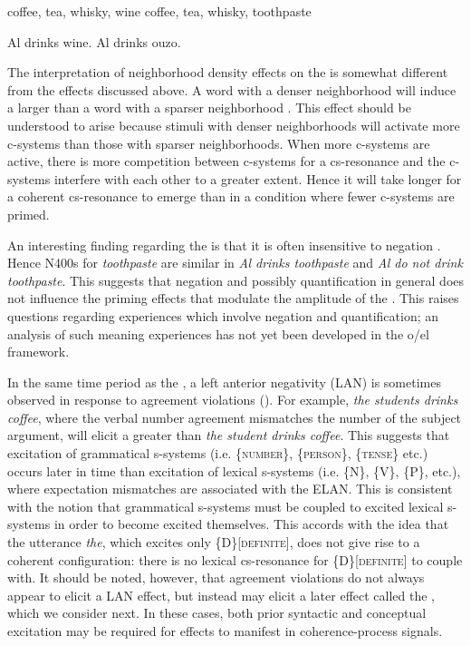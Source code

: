 \ea\label{ex:6:25}
\ea\label{ex:6:25a} coffee, tea, whisky, wine
\ex\label{ex:6:25b}  coffee, tea, whisky, toothpaste
\z
\z

\ea\label{ex:6:26}
\ea\label{ex:6:26a} Al drinks wine.
\ex\label{ex:6:26b} Al drinks ouzo.
\z
\z

  The interpretation of neighborhood density effects on the  is somewhat different from the effects discussed above. A word with a denser neighborhood will induce a larger  than a word with a sparser neighborhood \citep{HolcombEtAl2002,MüllerEtAl2010}. This effect should be understood to arise because stimuli with denser neighborhoods will activate more c-systems than those with sparser neighborhoods. When more c-systems are active, there is more competition between c-systems for a cs-resonance and the c-systems interfere with each other to a greater extent. Hence it will take longer for a coherent cs-resonance to emerge than in a condition where fewer c-systems are primed. 

  An interesting finding regarding the  is that it is often insensitive to negation \citep{KutasFedermeier2011}. Hence N400s for \textit{toothpaste} are similar in \textit{Al drinks toothpaste} and \textit{Al do not drink toothpaste}. This suggests that negation and possibly quantification in general does not influence the priming effects that modulate the amplitude of the . This raises questions regarding  experiences which involve negation and quantification; an analysis of such meaning experiences has not yet been developed in the o/el framework.

  In the same time period as the , a left anterior negativity (LAN) is sometimes observed in response to  agreement violations (\citealt{Friederici2002,GunterEtAl2000,KutasFedermeier2011,OsterhoutHolcomb1992}). For example, \textit{the students drinks coffee}, where the verbal number agreement mismatches the number of the subject argument, will elicit a greater  than \textit{the student drinks coffee}. This suggests that excitation of grammatical s-systems (i.e. \{\textsc{number}\}, \{\textsc{person}\}, \{\textsc{tense}\} etc.) occurs later in time than excitation of lexical s-systems (i.e. \{N\}, \{V\}, \{P\}, etc.), where expectation mismatches are associated with the ELAN. This is consistent with the notion that grammatical s-systems must be coupled to excited lexical s-systems in order to become excited themselves. This accords with the idea that the utterance \textit{the}, which excites only \{D\}[\textsc{definite}], does not give rise to a coherent configuration: there is no lexical cs-resonance for \{D\}[\textsc{definite}] to couple with. It should be noted, however, that agreement violations do not always appear to elicit a LAN effect, but instead may elicit a later effect called the , which we consider next. In these cases, both prior syntactic and conceptual excitation may be required for effects to manifest in coherence-process signals.

